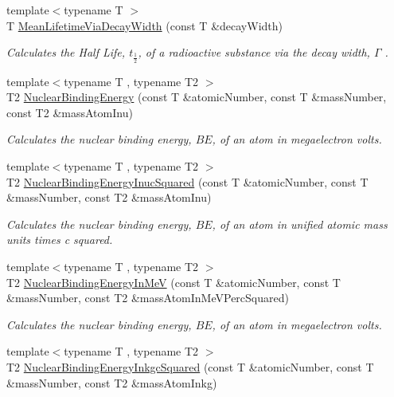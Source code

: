 \begin{DoxyCompactItemize}
{\footnotesize template$<$typename T $>$ }\\T \mbox{\hyperlink{group___e_g_x_phys-_mean_lifetime_ga8a1dda4168b4b25db93bf1ae7832fd7e}{Mean\+Lifetime\+Via\+Decay\+Width}} (const T \&decay\+Width)
\begin{DoxyCompactList}\small\item\em Calculates the Half Life, $t_{\frac{1}{2}}$, of a radioactive substance via the decay width, $\Gamma$ . \end{DoxyCompactList}\item 
{\footnotesize template$<$typename T , typename T2 $>$ }\\T2 \mbox{\hyperlink{group___e_g_x_phys-_nuclear_binding_energy_gab6832bf15ead7b4e867e759e0a2a078e}{Nuclear\+Binding\+Energy}} (const T \&atomic\+Number, const T \&mass\+Number, const T2 \&mass\+Atom\+Inu)
\begin{DoxyCompactList}\small\item\em Calculates the nuclear binding energy, $BE$, of an atom in megaelectron volts. \end{DoxyCompactList}\item 
{\footnotesize template$<$typename T , typename T2 $>$ }\\T2 \mbox{\hyperlink{group___e_g_x_phys-_nuclear_binding_energy_gafeed0fb7220e4900a8da011ed9fca44f}{Nuclear\+Binding\+Energy\+Inuc\+Squared}} (const T \&atomic\+Number, const T \&mass\+Number, const T2 \&mass\+Atom\+Inu)
\begin{DoxyCompactList}\small\item\em Calculates the nuclear binding energy, $BE$, of an atom in unified atomic mass units times c squared. \end{DoxyCompactList}\item 
{\footnotesize template$<$typename T , typename T2 $>$ }\\T2 \mbox{\hyperlink{group___e_g_x_phys-_nuclear_binding_energy_ga25f5d2d32fad7e28e278cf8b5ea8ffa8}{Nuclear\+Binding\+Energy\+In\+MeV}} (const T \&atomic\+Number, const T \&mass\+Number, const T2 \&mass\+Atom\+In\+Me\+V\+Perc\+Squared)
\begin{DoxyCompactList}\small\item\em Calculates the nuclear binding energy, $BE$, of an atom in megaelectron volts. \end{DoxyCompactList}\item 
{\footnotesize template$<$typename T , typename T2 $>$ }\\T2 \mbox{\hyperlink{group___e_g_x_phys-_nuclear_binding_energy_gaf229d8c0d2aa30ff95aa20e5213df3bd}{Nuclear\+Binding\+Energy\+Inkgc\+Squared}} (const T \&atomic\+Number, const T \&mass\+Number, const T2 \&mass\+Atom\+Inkg)

\end{DoxyCompactItemize}
